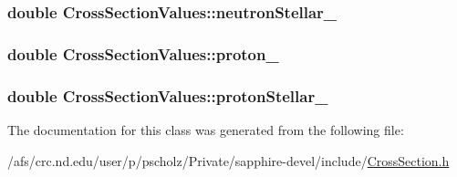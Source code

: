\hypertarget{classCrossSectionValues_a98880642976f3151a1db303a844f6ea5}{
\subsubsection[{neutron\-Stellar\-\_\-}]{\setlength{\rightskip}{0pt plus 5cm}double Cross\-Section\-Values\-::neutron\-Stellar\-\_\-}}\label{classCrossSectionValues_a98880642976f3151a1db303a844f6ea5}
\hypertarget{classCrossSectionValues_a67b8cc02e343363b59fbd03c453f3414}{
\subsubsection[{proton\-\_\-}]{\setlength{\rightskip}{0pt plus 5cm}double Cross\-Section\-Values\-::proton\-\_\-}}\label{classCrossSectionValues_a67b8cc02e343363b59fbd03c453f3414}
\hypertarget{classCrossSectionValues_a397ce725fd6c8f5f3c92422a811a79fd}{
\subsubsection[{proton\-Stellar\-\_\-}]{\setlength{\rightskip}{0pt plus 5cm}double Cross\-Section\-Values\-::proton\-Stellar\-\_\-}}\label{classCrossSectionValues_a397ce725fd6c8f5f3c92422a811a79fd}


The documentation for this class was generated from the following file\-:\begin{DoxyCompactItemize}
\item 
/afs/crc.\-nd.\-edu/user/p/pscholz/\-Private/sapphire-\/devel/include/\hyperlink{CrossSection_8h}{Cross\-Section.\-h}\end{DoxyCompactItemize}
